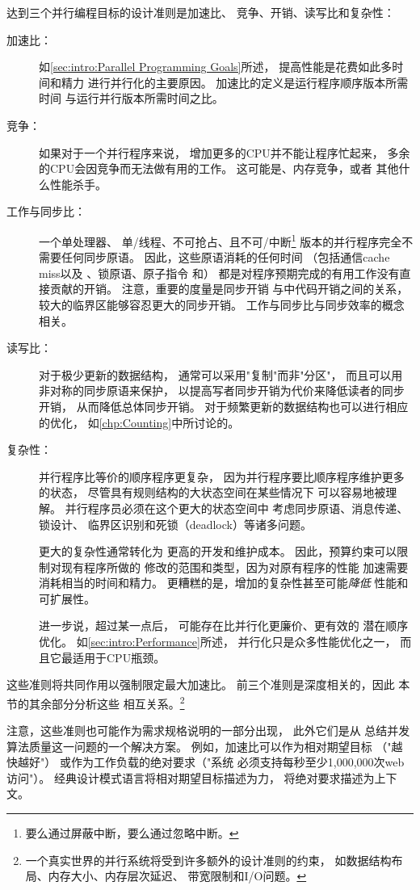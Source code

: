 达到三个并行编程目标的设计准则是加速比、
竞争、开销、读写比和复杂性：
\begin{description}
\item[加速比：]  如\cref{sec:intro:Parallel Programming Goals}所述，
	提高性能是花费如此多时间和精力
	进行并行化的主要原因。
	加速比的定义是运行程序顺序版本所需时间
	与运行并行版本所需时间之比。
\item[竞争：]  如果对于一个并行程序来说，
	增加更多的CPU并不能让程序忙起来，
	多余的CPU会因竞争而无法做有用的工作。
	这可能是、内存竞争，或者
	其他什么性能杀手。
\item[工作与同步比：]  一个单处理器、
	单\-/线程、不可抢占、且不可\-/中断\footnote{
		要么通过屏蔽中断，要么通过忽略中断。}
	版本的并行程序完全不需要任何同步原语。
	因此，这些原语消耗的任何时间
	（包括通信cache miss以及
	、锁原语、原子指令
	和）
	都是对程序预期完成的有用工作没有直接贡献的开销。
	注意，重要的度量是同步开销
	与中代码开销之间的关系，
	较大的临界区能够容忍更大的同步开销。
	工作与同步比与同步效率的概念相关。
\item[读写比：]  对于极少更新的数据结构，
	通常可以采用"复制"而非"分区"，
	而且可以用非对称的同步原语来保护，
	以提高写者同步开销为代价来降低读者的同步开销，
	从而降低总体同步开销。
	对于频繁更新的数据结构也可以进行相应的优化，
	如\cref{chp:Counting}中所讨论的。
\item[复杂性：]  并行程序比等价的顺序程序更复杂，
	因为并行程序要比顺序程序维护更多的状态，
	尽管具有规则结构的大状态空间在某些情况下
	可以容易地被理解。
	并行程序员必须在这个更大的状态空间中
	考虑同步原语、消息传递、锁设计、
	临界区识别和死锁（deadlock）等诸多问题。

	更大的复杂性通常转化为
	更高的开发和维护成本。
	因此，预算约束可以限制对现有程序所做的
	修改的范围和类型，因为对原有程序的性能
	加速需要消耗相当的时间和精力。
	更糟糕的是，增加的复杂性甚至可能\emph{降低}
	性能和可扩展性。

	进一步说，超过某一点后，
	可能存在比并行化更廉价、更有效的
	潜在顺序优化。
	如\cref{sec:intro:Performance}所述，
	并行化只是众多性能优化之一，
	而且它最适用于CPU瓶颈。
\end{description}
这些准则将共同作用以强制限定最大加速比。
前三个准则是深度相关的，因此
本节的其余部分分析这些
相互关系。\footnote{
	一个真实世界的并行系统将受到许多额外的设计准则的约束，
	如数据结构布局、内存大小、内存层次延迟、
	带宽限制和I/O问题。}

注意，这些准则也可能作为需求规格说明的一部分出现，
此外它们是从
总结并发算法质量这一问题的一个解决方案。
例如，加速比可以作为相对期望目标
（"越快越好"）
或作为工作负载的绝对要求（"系统
必须支持每秒至少1,000,000次web访问"）。
经典设计模式语言将相对期望目标描述为力，
将绝对要求描述为上下文。

